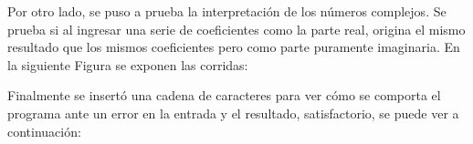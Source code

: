 Por otro lado, se puso a prueba la interpretación de los números complejos. Se prueba si al ingresar una serie de coeficientes como la parte real, origina el mismo resultado que los mismos coeficientes pero como parte puramente imaginaria. En la siguiente Figura se exponen las corridas:



Finalmente se insertó una cadena de caracteres para ver cómo se comporta el programa ante un error en la entrada y el resultado, satisfactorio, se puede ver a continuación:



